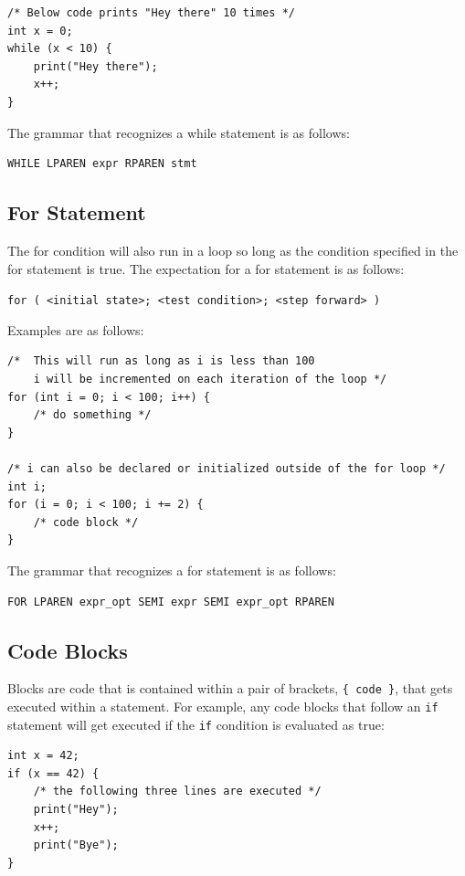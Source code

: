 \documentclass{article}
\begin{document}
\begin{lstlisting}
/* Below code prints "Hey there" 10 times */
int x = 0;
while (x < 10) {
	print("Hey there");
	x++;
}
\end{lstlisting}

The grammar that recognizes a while statement is as follows:
\begin{Verbatim}[frame=single]
WHILE LPAREN expr RPAREN stmt
\end{Verbatim}

\subsection{For Statement}
The for condition will also run in a loop so long as the condition specified in the for statement is true.  The expectation for a for statement is as follows:

\texttt{for ( <initial state>; <test condition>; <step forward> )}

Examples are as follows:

\begin{lstlisting}
/* 	This will run as long as i is less than 100
	i will be incremented on each iteration of the loop */
for (int i = 0; i < 100; i++) {
	/* do something */
}

/* i can also be declared or initialized outside of the for loop */
int i;
for (i = 0; i < 100; i += 2) {
	/* code block */
}
\end{lstlisting}

The grammar that recognizes a for statement is as follows:
\begin{Verbatim}[frame=single]
FOR LPAREN expr_opt SEMI expr SEMI expr_opt RPAREN
\end{Verbatim}

\subsection{Code Blocks}
Blocks are code that is contained within a pair of brackets, \texttt{\{ code \}}, that gets executed within a statement.  For example, any code blocks that follow an \texttt{if} statement will get executed if the \texttt{if} condition is evaluated as true:

\begin{lstlisting}
int x = 42;
if (x == 42) {
	/* the following three lines are executed */
	print("Hey");
	x++;
	print("Bye");
}
\end{lstlisting}
\end{document}

